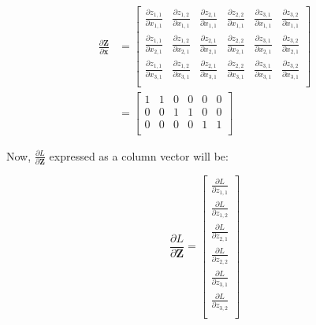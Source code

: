 \documentclass{article}
\newcommand{\vecr}[1]{\bm{#1}}
\newcommand{\matr}[1]{\mathbf{#1}} %
\begin{document}
\begin{align}
\frac{\partial \matr{Z}}{\partial \vecr{x}} &=
\begin{bmatrix}
\frac{\partial z_{1,1}}{\partial x_{1,1}} & \frac{\partial z_{1,2}}{\partial x_{1,1}} & \frac{\partial z_{2,1}}{\partial x_{1,1}} & \frac{\partial z_{2,2}}{\partial x_{1,1}} & \frac{\partial z_{3,1}}{\partial x_{1,1}} & \frac{\partial z_{3,2}}{\partial x_{1,1}} \\[0.7em]
\frac{\partial z_{1,1}}{\partial x_{2,1}} & \frac{\partial z_{1,2}}{\partial x_{2,1}} & \frac{\partial z_{2,1}}{\partial x_{2,1}} & \frac{\partial z_{2,2}}{\partial x_{2,1}} & \frac{\partial z_{3,1}}{\partial x_{2,1}} & \frac{\partial z_{3,2}}{\partial x_{2,1}} \\[0.7em]
\frac{\partial z_{1,1}}{\partial x_{3,1}} & \frac{\partial z_{1,2}}{\partial x_{3,1}} & \frac{\partial z_{2,1}}{\partial x_{3,1}} & \frac{\partial z_{2,2}}{\partial x_{3,1}} & \frac{\partial z_{3,1}}{\partial x_{3,1}} & \frac{\partial z_{3,2}}{\partial x_{3,1}} \\[0.7em]
\end{bmatrix} \nonumber
\\ \label{dZbydX_broadcast_column_vector}
&=
\begin{bmatrix}
1 & 1 & 0 & 0 & 0 & 0\\%
0 & 0 & 1 & 1 & 0 & 0\\%
0 & 0 & 0 & 0 & 1 & 1\\%
\end{bmatrix}
\end{align}

Now, $\frac{\partial L}{\partial \matr{Z}}$ expressed as a column vector will be:

\begin{equation} \label{dZAsColumnVector_broadcast_column_vector}
\frac{\partial L}{\partial \matr{Z}} =
\begin{bmatrix}
\frac{\partial L}{\partial z_{1,1}} \\[0.7em]
\frac{\partial L}{\partial z_{1,2}} \\[0.7em]
\frac{\partial L}{\partial z_{2,1}} \\[0.7em]
\frac{\partial L}{\partial z_{2,2}} \\[0.7em]
\frac{\partial L}{\partial z_{3,1}} \\[0.7em]
\frac{\partial L}{\partial z_{3,2}} \\[0.7em]
\end{bmatrix}
\end{equation}
\end{document}
